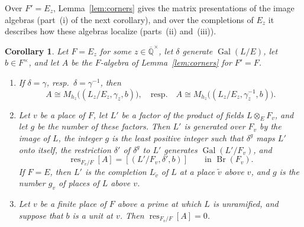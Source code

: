 \documentclass[a4paper,11pt]{amsart}
\newtheorem{corollary}[theorem]{Corollary}
\theoremstyle{definition}
\theoremstyle{remark}
\numberwithin{equation}{section}
\DeclareMathOperator{\Br}{Br}
\DeclareMathOperator{\res}{res}
\DeclareMathOperator{\Gal}{Gal}
\newcommand{\Qbar}{\overline{\mathbb{Q}}}
\begin{document}
Over $F'=E_z$, Lemma~\ref{lem:corners} gives the matrix presentations of the image algebras (part~(i) of the next corollary), and over the completions of $E_z$ it describes how these algebras localize (parts~(ii) and~(iii)).

\begin{corollary}\label{cor:localization}
Let $F=E_z$ for some $z\in\Qbar^\times$, let $\delta$ generate $\Gal(L/E)$, let $b\in F^\times$, and let $A$ be the $F$-algebra of Lemma~\ref{lem:corners} for $F'=F$.
\begin{enumerate}
\item[(i)] If $\delta=\gamma$, resp.\ $\delta=\gamma^{-1}$, then
\[
 A\cong M_{h_z}\bigl((L_z/E_z,\gamma_z,b)\bigr),\quad\text{resp.}\quad A\cong M_{h_z}\bigl((L_z/E_z,\gamma_z^{-1},b)\bigr).
\]
\item[(ii)] Let $v$ be a place of $F$, let $L'$ be a factor of the product of fields $L\otimes_EF_v$, and let $g$ be the number of these factors. Then $L'$ is generated over $F_v$ by the image of $L$, the integer $g$ is the least positive integer such that $\delta^g$ maps $L'$ onto itself, the restriction $\delta'$ of $\delta^g$ to $L'$ generates $\Gal(L'/F_v)$, and
\[
 \res_{F_v/F}[A]=[(L'/F_v,\delta',b)]\qquad\text{in }\Br(F_v).
\]
If $F=E$, then $L'$ is the completion $L_{\tilde v}$ of $L$ at a place $\tilde v$ above $v$, and $g$ is the number $g_v$ of places of $L$ above $v$.
\item[(iii)] Let $v$ be a finite place of $F$ above a prime at which $L$ is unramified, and suppose that $b$ is a unit at $v$. Then $\res_{F_v/F}[A]=0$.
\end{enumerate}
\end{corollary}
\end{document}
